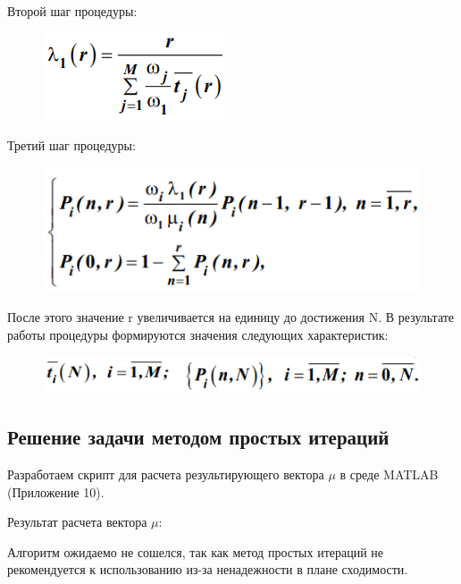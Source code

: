 Второй шаг процедуры:

\begin{figure}[h!]
	\centering
	\includegraphics[scale = 0.69]{images/p3_4_2.png}
	\label{image:p3_42}
\end{figure}

Третий шаг процедуры:

\begin{figure}[h!]
	\centering
	\includegraphics[scale = 0.69]{images/p3_4_3.png}
	\label{image:p3_43}
\end{figure}

\clearpage

После этого значение r увеличивается на единицу до достижения N. В результате работы процедуры формируются значения следующих характеристик:

\begin{figure}[h!]
	\centering
	\includegraphics[scale = 0.69]{images/p3_4_4.png}
	\label{image:p3_44}
\end{figure}

\subsection{Решение задачи методом простых итераций}

Разработаем скрипт для расчета результирующего вектора $\mu$ в среде MATLAB (Приложение 10).

Результат расчета вектора $\mu$:



Алгоритм ожидаемо не сошелся, так как метод простых итераций не рекомендуется к использованию из-за ненадежности в плане сходимости.


